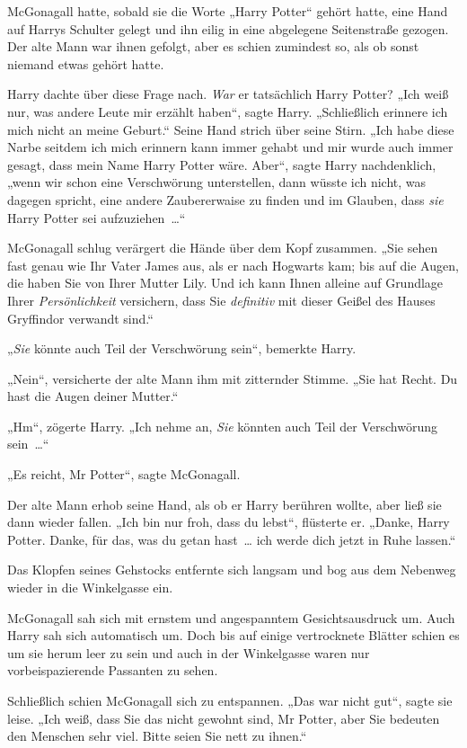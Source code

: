 {McGonagall hatte, sobald sie die Worte „Harry Potter“ gehört hatte, eine Hand auf Harrys Schulter gelegt und ihn eilig in eine abgelegene Seitenstraße gezogen. Der alte Mann war ihnen gefolgt, aber es schien zumindest so, als ob sonst niemand etwas gehört hatte.

Harry dachte über diese Frage nach. \emph{War} er tatsächlich Harry Potter? „Ich weiß nur, was andere Leute mir erzählt haben“, sagte Harry. „Schließlich erinnere ich mich nicht an meine Geburt.“ Seine Hand strich über seine Stirn. „Ich habe diese Narbe seitdem ich mich erinnern kann immer gehabt und mir wurde auch immer gesagt, dass mein Name Harry Potter wäre. Aber“, sagte Harry nachdenklich, „wenn wir schon eine Verschwörung unterstellen, dann wüsste ich nicht, was dagegen spricht, eine andere Zaubererwaise zu finden und im Glauben, dass \emph{sie} Harry Potter sei aufzuziehen~…“

McGonagall schlug verärgert die Hände über dem Kopf zusammen. „Sie sehen fast genau wie Ihr Vater James aus, als er nach Hogwarts kam; bis auf die Augen, die haben Sie von Ihrer Mutter Lily. Und ich kann Ihnen alleine auf Grundlage Ihrer \emph{Persönlichkeit} versichern, dass Sie \emph{definitiv} mit dieser Geißel des Hauses Gryffindor verwandt sind.“

„\emph{Sie} könnte auch Teil der Verschwörung sein“, bemerkte Harry.

„Nein“, versicherte der alte Mann ihm mit zitternder Stimme. „Sie hat Recht. Du hast die Augen deiner Mutter.“

„Hm“, zögerte Harry. „Ich nehme an, \emph{Sie} könnten auch Teil der Verschwörung sein~…“

„Es reicht, Mr Potter“, sagte McGonagall.

Der alte Mann erhob seine Hand, als ob er Harry berühren wollte, aber ließ sie dann wieder fallen. „Ich bin nur froh, dass du lebst“, flüsterte er. „Danke, Harry Potter. Danke, für das, was du getan hast~… ich werde dich jetzt in Ruhe lassen.“

Das Klopfen seines Gehstocks entfernte sich langsam und bog aus dem Nebenweg wieder in die Winkelgasse ein.

McGonagall sah sich mit ernstem und angespanntem Gesichtsausdruck um. Auch Harry sah sich automatisch um. Doch bis auf einige vertrocknete Blätter schien es um sie herum leer zu sein und auch in der Winkelgasse waren nur vorbeispazierende Passanten zu sehen.

Schließlich schien McGonagall sich zu entspannen. „Das war nicht gut“, sagte sie leise. „Ich weiß, dass Sie das nicht gewohnt sind, Mr Potter, aber Sie bedeuten den Menschen sehr viel. Bitte seien Sie nett zu ihnen.“

}
